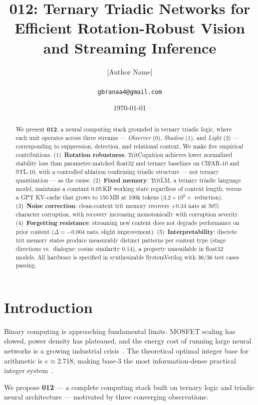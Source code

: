 \documentclass[10pt,twocolumn]{article}
\title{\textbf{012: Ternary Triadic Networks for\\Efficient Rotation-Robust Vision and Streaming Inference}}
\author{
  [Author Name]\\
  [Institution / Independent]\\
  \texttt{gbranaa4@gmail.com}
}
\date{\today}
\newcommand{\tritnet}{TritCognition}
\newcommand{\tritlm}{TritLM}
\begin{document}
\maketitle

\begin{abstract}
We present \textbf{012}, a neural computing stack grounded in ternary triadic
logic, where each unit operates across three streams ---
\textit{Observer} (0), \textit{Shadow} (1), and \textit{Light} (2) ---
corresponding to suppression, detection, and relational context.
We make five empirical contributions.
(1)~\textbf{Rotation robustness}: \tritnet{} achieves lower normalized
stability loss than parameter-matched float32 and ternary baselines on CIFAR-10
and STL-10, with a controlled ablation confirming triadic structure --- not
ternary quantization --- as the cause.
(2)~\textbf{Fixed memory}: \tritlm{}, a ternary triadic language model,
maintains a constant 0.05\,KB working state regardless of context length,
versus a GPT KV-cache that grows to 150\,MB at 100k tokens
($3.2\times10^6\times$ reduction).
(3)~\textbf{Noise correction}: clean-context trit memory recovers
$+0.34$ nats at 50\% character corruption, with recovery increasing
monotonically with corruption severity.
(4)~\textbf{Forgetting resistance}: streaming new content does not degrade
performance on prior content ($\Delta{=}{-}0.004$ nats, slight improvement).
(5)~\textbf{Interpretability}: discrete trit memory states produce
measurably distinct patterns per content type (stage directions vs.\ dialogue:
cosine similarity $0.14$), a property unavailable in float32 models.
All hardware is specified in synthesizable SystemVerilog with 36/36
test cases passing.
\end{abstract}

\section{Introduction}

Binary computing is approaching fundamental limits. MOSFET scaling has slowed,
power density has plateaued, and the energy cost of running large neural
networks is a growing industrial crisis~\cite{thompson2021}.
The theoretical optimal integer base for arithmetic is $e \approx 2.718$,
making base-3 the most information-dense practical integer
system~\cite{hayes2001}.

We propose \textbf{012} --- a complete computing stack built on ternary logic
and triadic neural architecture --- motivated by three converging observations:
\end{document}
